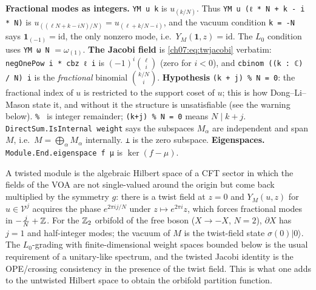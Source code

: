 \begin{dictionary}
\textbf{Fractional modes as integers.} \verb|YM u k| is $u_{(k/N)}$. Thus
\verb|YM u (ℓ * N + k - i * N)| is $u_{((\ell N+k-iN)/N)} = u_{(\ell + k/N - i)}$, and the
vacuum condition \verb|k = -N| says $\mathbf 1_{(-1)} = \mathrm{id}$, the only nonzero mode,
i.e.\ $Y_M(\mathbf 1,z) = \mathrm{id}$. The $L_0$ condition uses \verb|YM ω N| $=\omega_{(1)}$.
\textbf{The Jacobi field} is \eqref{ch07:eq:twjacobi} verbatim: \verb|negOnePow i * cbz ℓ i| is
$(-1)^i\binom{\ell}{i}$ (zero for $i<0$), and \verb|cbinom ((k : ℂ) / N) i| is the
\emph{fractional} binomial $\binom{k/N}{i}$. \textbf{Hypothesis} \verb|(k + j) % N = 0|: the
fractional index of $u$ is restricted to the support coset of $u$; this is how Dong--Li--Mason
state it, and without it the structure is unsatisfiable (see the warning below).
\verb|% | is integer remainder; \verb|(k+j) % N = 0| means $N\mid k+j$. \verb|DirectSum.IsInternal weight|
says the subspaces $M_\alpha$ are independent and span $M$, i.e.\ $M = \bigoplus_\alpha M_\alpha$
internally. \verb|⊥| is the zero subspace.
\textbf{Eigenspaces.} \verb|Module.End.eigenspace f μ| is $\ker(f-\mu)$.
\end{dictionary}

\begin{physics}
A twisted module is the algebraic Hilbert space of a CFT sector in which the fields of the VOA are not single-valued around the origin but come back multiplied by the symmetry $g$: there is a twist field at $z=0$ and $Y_M(u,z)$ for $u\in\mathcal V^j$ acquires the phase $e^{2\pi ij/N}$ under $z\mapsto e^{2\pi i}z$, which forces fractional modes in $-\tfrac jN+{\mathbb{Z}}$. For the ${\mathbb{Z}}_2$ orbifold of the free boson ($X\to-X$, $N=2$), $\partial X$ has $j=1$ and half-integer modes; the vacuum of $M$ is the twist-field state $\sigma(0)|0\rangle$. The $L_0$-grading with finite-dimensional weight spaces bounded below is the usual requirement of a unitary-like spectrum, and the twisted Jacobi identity is the OPE/crossing consistency in the presence of the twist field. This is what one adds to the untwisted Hilbert space to obtain the orbifold partition function.
\end{physics}

